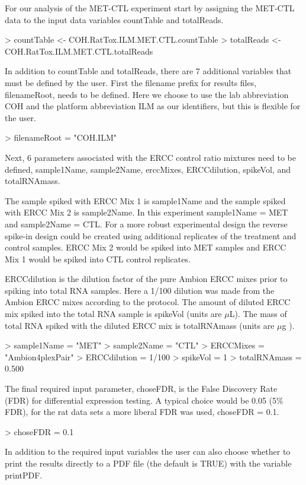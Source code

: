 \documentclass{article}
\begin{document}
For our analysis of the MET-CTL experiment start by assigning the MET-CTL data 
to the input data variables countTable and totalReads.
\begin{Schunk}
\begin{Sinput}
> countTable <- COH.RatTox.ILM.MET.CTL.countTable
> totalReads <- COH.RatTox.ILM.MET.CTL.totalReads
\end{Sinput}
\end{Schunk}
In addition to countTable and totalReads, there are 7 additional variables that
must be defined by the user. First the filename prefix for results files, 
filenameRoot, needs to be defined. Here we choose to use the lab abbreviation 
COH and the platform abbreviation ILM as our identifiers, but this is flexible
for the user.
\begin{Schunk}
\begin{Sinput}
> filenameRoot = "COH.ILM"
\end{Sinput}
\end{Schunk}
Next, 6 parameters associated with the ERCC control ratio mixtures need to be
defined, sample1Name, sample2Name, erccMixes, ERCCdilution, spikeVol, and totalRNAmass.

The sample spiked with ERCC Mix 1 is sample1Name and the sample spiked with 
ERCC Mix 2 is sample2Name. In this experiment sample1Name = MET and 
sample2Name = CTL. For a more robust experimental design the reverse spike-in 
design could be created using additional replicates of the treatment and 
control samples. ERCC Mix 2 would be spiked into MET samples and ERCC Mix 1 
would be spiked into CTL control replicates. 

ERCCdilution is the dilution factor of the pure Ambion ERCC mixes prior to 
spiking into total RNA samples. Here a 1/100 dilution was made from the Ambion 
ERCC mixes according to the protocol. The amount of diluted ERCC mix spiked into
the total RNA sample is spikeVol (units are $\mu$L). The mass of total RNA 
spiked with the diluted ERCC mix is totalRNAmass (units are $\mu$g ).
\begin{Schunk}
\begin{Sinput}
> sample1Name = "MET"
> sample2Name = "CTL"
> ERCCMixes = "Ambion4plexPair"
> ERCCdilution = 1/100
> spikeVol = 1
> totalRNAmass = 0.500
\end{Sinput}
\end{Schunk}
The final required input parameter, choseFDR, is the False Discovery Rate (FDR) 
for differential expression testing. A typical choice would be 0.05 (5\% FDR), 
for the rat data sets a more liberal FDR was used, choseFDR = 0.1.
\begin{Schunk}
\begin{Sinput}
> choseFDR = 0.1
\end{Sinput}
\end{Schunk}
In addition to the required input variables the user can also choose whether to 
print the results directly to a PDF file (the default is TRUE) with the variable
printPDF.
\end{document}

